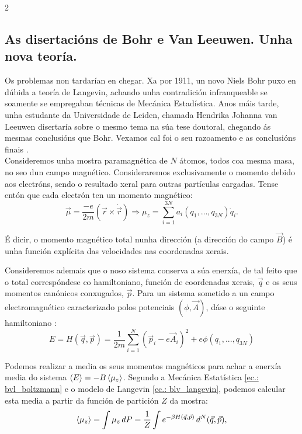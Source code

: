 \begin{multicols}{2}
\subsection*{As disertacións de Bohr e Van Leeuwen. Unha nova teoría.}

Os problemas non tardarían en chegar. Xa por 1911, un novo Niels Bohr puxo en
dúbida a teoría de Langevin, achando unha contradición infranqueable se
soamente se empregaban técnicas de Mecánica Estadística. Anos máis tarde, unha
estudante da Universidade de Leiden, chamada Hendrika Johanna van Leeuwen
disertaría sobre o mesmo tema na súa tese doutoral, chegando ás mesmas
conclusións que Bohr. Vexamos cal foi o seu razoamento e as conclusións finais
\cite[Sec. 1.2.2.]{blundell.s_2001}.\\

Consideremos unha mostra paramagnética de $N$ átomos, todos coa mesma masa, no
seo dun campo magnético. Consideraremos exclusivamente o momento debido aos
electróns, sendo o resultado xeral para outras partículas cargadas. Tense entón
que cada electrón ten un momento magnético:
$$\vec \mu = \frac{-e}{2m} ({\vec r}\times \dot {\vec r}) \Rightarrow
\mu_z=\sum_{i=1}^{3N}a_i(q_1,\dots,q_{3N})\dot q_i.$$

É dicir, o momento magnético total nunha dirección (a dirección do campo $\vec
B$) é unha función explícita das velocidades nas coordenadas xerais.

Consideremos ademais que o noso sistema conserva a súa enerxía, de tal feito
que o total correspóndese co hamiltoniano, función de coordenadas xerais, $\vec
q$ e os seus momentos canónicos conxugados, $\vec p$. Para un sistema sometido
a un campo electromagnético caracterizado polos potenciais $(\phi,\vec A)$,
dáse o seguinte hamiltoniano :
\begin{equation}\label{ec.: bvl_hamiltoniano}
    E=H(\vec q,\vec p) = \frac{1}{2m}\sum_{i=1}^N (\vec p_i - e\vec
    A_i)^2 + e\phi(q_1,...,q_{3N})
\end{equation}

Podemos realizar a media os seus momentos magnéticos para achar a enerxía media do
sistema $\braket{E} = -B\braket{\mu_z}$. Segundo a Mecánica Estatística
\eqref{ec.: bvl_boltzmann} e o modelo de Langevin \eqref{ec.: blv_langevin},
podemos calcular esta media a partir da función de partición $Z$ da mostra:
\begin{equation}\label{ec.: bvl-mec_est}
    \braket{\mu_z} = \int \mu_z\, dP = \frac{1}{Z}\int e^{-\beta
    H(\vec q,\vec p)} \, d^N(\vec q, \vec p),
\end{equation}


\end{multicols}
